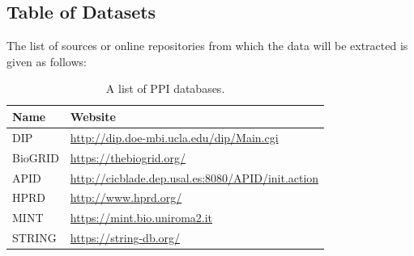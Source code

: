\subsection{Table of Datasets}
The list of sources or online repositories from which the data will be extracted is given as follows:
\begin{table}[htpb]
      \centering
      \caption{A list of PPI databases.}
      \vspace{1 em}
      \label{tab:dataset1}
      \begin{tabular}{l|l}
      \hline
      Name & Website \\
      \hline
      DIP & \url{http://dip.doe-mbi.ucla.edu/dip/Main.cgi}\\
      BioGRID & \url{https://thebiogrid.org/} \\
      APID & \url{http://cicblade.dep.usal.es:8080/APID/init.action}\\
      HPRD & \url{http://www.hprd.org/} \\ 
      MINT & \url{https://mint.bio.uniroma2.it}\\
    STRING & \url{https://string-db.org/} \\
    \hline
    \end{tabular}
  \end{table}

